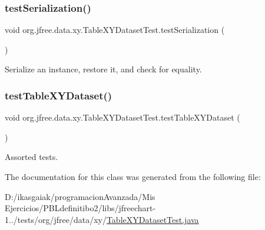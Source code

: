 \subsubsection{\texorpdfstring{test\+Serialization()}{testSerialization()}}
{\footnotesize\ttfamily void org.\+jfree.\+data.\+xy.\+Table\+X\+Y\+Dataset\+Test.\+test\+Serialization (\begin{DoxyParamCaption}{ }\end{DoxyParamCaption})}

Serialize an instance, restore it, and check for equality. \mbox{\label{classorg_1_1jfree_1_1data_1_1xy_1_1_table_x_y_dataset_test_a76c9ce4572467bebb7ae5cd5d169211a}} 
\subsubsection{\texorpdfstring{test\+Table\+X\+Y\+Dataset()}{testTableXYDataset()}}
{\footnotesize\ttfamily void org.\+jfree.\+data.\+xy.\+Table\+X\+Y\+Dataset\+Test.\+test\+Table\+X\+Y\+Dataset (\begin{DoxyParamCaption}{ }\end{DoxyParamCaption})}

Assorted tests. 

The documentation for this class was generated from the following file\+:\begin{DoxyCompactItemize}
\item 
D\+:/ikasgaiak/programacion\+Avanzada/\+Mis Ejercicios/\+P\+B\+Ldefinitibo2/libs/jfreechart-\/1../tests/org/jfree/data/xy/\mbox{\hyperlink{_table_x_y_dataset_test_8java}{Table\+X\+Y\+Dataset\+Test.\+java}}\end{DoxyCompactItemize}
